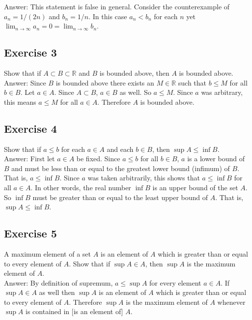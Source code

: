 \documentclass{article}
\begin{document}
Answer: This statement is false in general. Consider the counterexample of $a_n = 1/(2n)$ and $b_n = 1/n$. In this case $a_n < b_n$ for each $n$ yet $\lim_{n\rightarrow\infty} a_n = 0 = \lim_{n\rightarrow \infty} b_n$.

\subsection*{Exercise 3}
Show that if $A \subset B \subset \mathbb{R}$ and $B$ is bounded above, then $A$ is bounded above. \\

Answer: Since $B$ is bounded above there exists an $M \in \mathbb{R}$ such that $b \leq M$ for all $b \in B$. Let $a \in A$. Since $A \subset B$, $a \in B$ as well. So $a \leq M$. Since $a$ was arbitrary, this means $a \leq M$ for all $a \in A$. Therefore $A$ is bounded above.

\newpage

\subsection*{Exercise 4}
Show that if $a \leq b$ for each $a \in A$ and each $b \in B$, then $\sup A \leq \inf B$. \\

Answer: First let $a \in A$ be fixed. Since $a \leq b$ for all $b \in B$, $a$ is a lower bound of $B$ and must be less than or equal to the greatest lower bound (infimum) of $B$. That is, $a \leq \inf B$. Since $a$ was taken arbitrarily, this shows that $a \leq \inf B$ for all $a \in A$. In other words, the real number $\inf B$ is an upper bound of the set $A$. So $\inf B$ must be greater than or equal to the least upper bound of $A$. That is, $\sup A \leq \inf B$. 

\subsection*{Exercise 5}
A maximum element of a set $A$ is an element of $A$ which is greater than or equal to every element of $A$. Show that if $\sup A \in A$, then $\sup A$ is the maximum element of $A$. \\

Answer: By definition of supremum, $a \leq \sup A$ for every element $a \in A$. If $\sup A \in A$ as well then $\sup A$ is an element of $A$ which is greater than or equal to every element of $A$. Therefore $\sup A$ is the maximum element of $A$ whenever $\sup A$ is contained in [is an element of] $A$.
\end{document}
